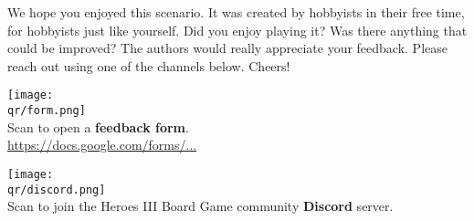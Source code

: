 

\vspace{\baselineskip}
We hope you enjoyed this scenario.  %
It was created by hobbyists in their free time, for hobbyists just like yourself.
Did you enjoy playing it?
Was there anything that could be improved?
The authors would really appreciate your feedback.
Please reach out using one of the channels below.
Cheers!

\begin{multicols}{2}
  \bigbreak
  \centering
  \texttt{[image: \\qr/form.png]} \\
  Scan to open a \textbf{feedback form}.\\
  \href{\formurl}{https://docs.google.com/forms/...}

  \columnbreak
  \texttt{[image: \\qr/discord.png]}\\
  Scan to join the Heroes III Board Game community \textbf{Discord} server.\\
  \href{\discordurl}{\discordurl}
\end{multicols}

\vfill
\begin{center}
\end{center}
